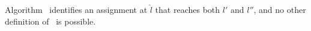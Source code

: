 \label{fig:osr-reconstruct} Algorithm \reconstruct\ identifies an assignment  at $\hat{l}$ that reaches both $l'$ and $l''$, and no other definition of \wx\ is possible.